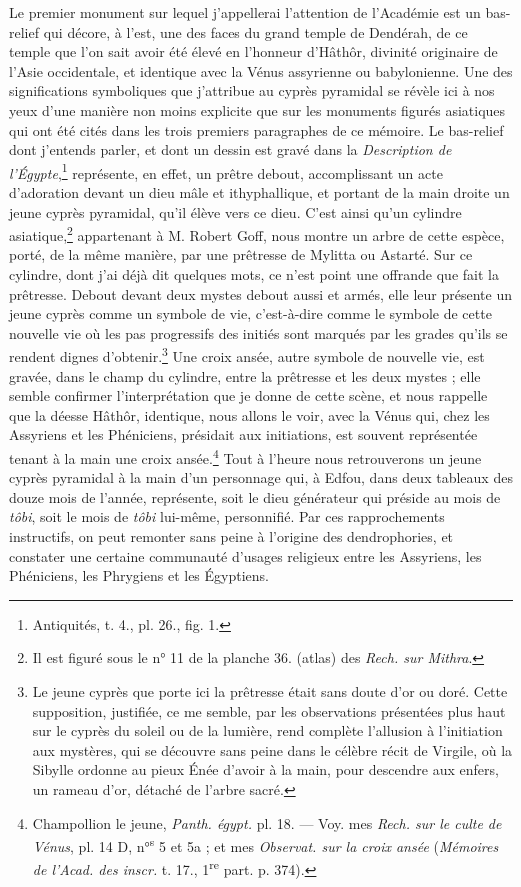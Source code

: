 \documentclass{article}
\begin{document}
Le premier monument sur lequel j'appellerai l'attention de l'Académie est un bas-relief qui décore, à l'est, une des faces du grand temple de Dendérah, de ce temple que l'on sait avoir été élevé en l'honneur d'Hâthôr, divinité originaire de l'Asie occidentale, et identique avec la Vénus assyrienne ou babylonienne. Une des significations symboliques que j'attribue au cyprès pyramidal se révèle ici à nos yeux d'une manière non moins explicite que sur les monuments figurés asiatiques qui ont été cités dans les trois premiers paragraphes de ce mémoire. Le bas-relief dont j'entends parler, et dont un dessin est gravé dans la \emph{Description de l'Égypte},\footnote{Antiquités, t. 4., pl. 26., fig. 1.} représente, en effet, un prêtre debout, accomplissant un acte d'adoration devant un dieu mâle et ithyphallique, et portant de la main droite un jeune cyprès pyramidal, qu'il élève vers ce dieu. C'est ainsi qu'un cylindre asiatique,\footnote{Il est figuré sous le n° 11 de la planche 36. (atlas) des \emph{Rech. sur Mithra}.} appartenant à M. Robert Goff, nous montre un arbre de cette espèce, porté, de la même manière, par une prêtresse de Mylitta ou Astarté. Sur ce cylindre, dont j'ai déjà dit quelques mots, ce n'est point une offrande que fait la prêtresse. Debout devant deux mystes debout aussi et armés, elle leur présente un jeune cyprès comme un symbole de vie, c'est-à-dire comme le symbole de cette nouvelle vie où les pas progressifs des initiés sont marqués par les grades qu'ils se rendent dignes d'obtenir.\footnote{Le jeune cyprès que porte ici la prêtresse était sans doute d'or ou doré. Cette supposition, justifiée, ce me semble, par les observations présentées plus haut sur le cyprès du soleil ou de la lumière, rend complète l'allusion à l'initiation aux mystères, qui se découvre sans peine dans le célèbre récit de Virgile, où la Sibylle ordonne au pieux Énée d'avoir à la main, pour descendre aux enfers, un rameau d'or, détaché de l'arbre sacré.} Une croix ansée, autre symbole de nouvelle vie, est gravée, dans le champ du cylindre, entre la prêtresse et les deux mystes ; elle semble confirmer l'interprétation que je donne de cette scène, et nous rappelle que la déesse Hâthôr, identique, nous allons le voir, avec la Vénus qui, chez les Assyriens et les Phéniciens, présidait aux initiations, est souvent représentée tenant à la main une croix ansée.\footnote{Champollion le jeune, \emph{Panth. égypt.} pl. 18. --- Voy. mes \emph{Rech. sur le culte de Vénus}, pl. 14 D, n°\textsuperscript{s} 5 et 5a ; et mes \emph{Observat. sur la croix ansée} (\emph{Mémoires de l'Acad. des inscr.} t. 17., 1\textsuperscript{re} part. p. 374).} Tout à l'heure nous retrouverons un jeune cyprès pyramidal à la main d'un personnage qui, à Edfou, dans deux tableaux des douze mois de l'année, représente, soit le dieu générateur qui préside au mois de \emph{tôbi}, soit le mois de \emph{tôbi} lui-même, personnifié. Par ces rapprochements instructifs, on peut remonter sans peine à l'origine des dendrophories, et constater une certaine communauté d'usages religieux entre les Assyriens, les Phéniciens, les Phrygiens et les Égyptiens.
\end{document}
